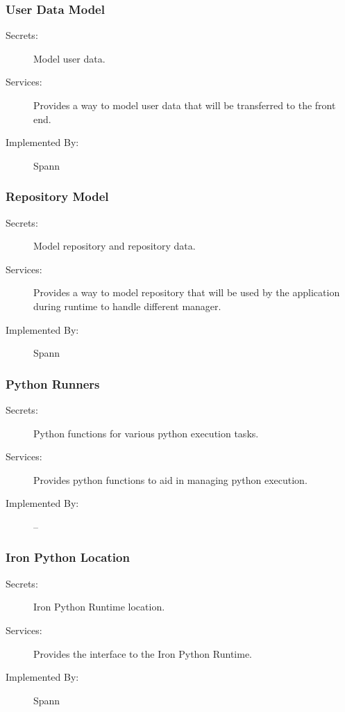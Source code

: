 \documentclass[12pt, titlepage]{article}
\begin{document}
\subsubsection{User Data Model}

\begin{description}
\item[Secrets:] Model user data.
\item[Services:] Provides a way to model user data that will be transferred to the front end.
\item[Implemented By:] Spann
\end{description}


\subsubsection{Repository Model}

\begin{description}
\item[Secrets:] Model repository and repository data.
\item[Services:] Provides a way to model repository that will be used by the
    application during runtime to handle different manager.
\item[Implemented By:] Spann
\end{description}

\subsubsection{Python Runners}

\begin{description}
\item[Secrets:] Python functions for various python execution tasks.
\item[Services:] Provides python functions to aid in managing python execution.
\item[Implemented By:] --
\end{description}

\subsubsection{Iron Python Location}

\begin{description}
\item[Secrets:] Iron Python Runtime location.
\item[Services:] Provides the interface to the Iron Python Runtime.
\item[Implemented By:] Spann
\end{description}
\end{document}

